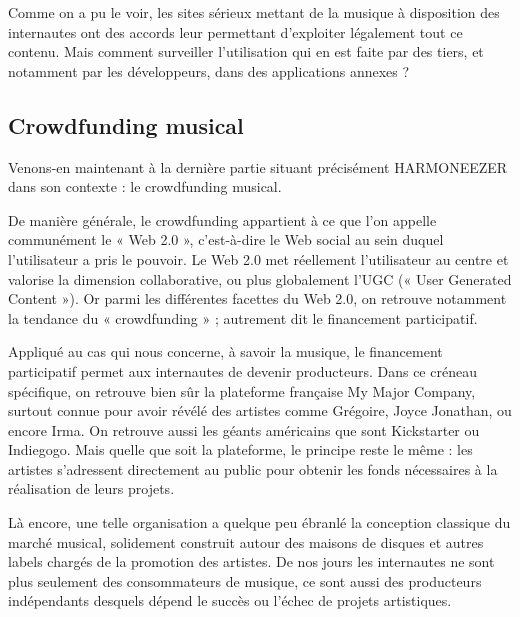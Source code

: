 \documentclass[a4paper,12pt]{article}
\begin{document}
Comme on a pu le voir, les sites sérieux mettant de la musique à disposition des internautes ont des accords leur permettant d'exploiter légalement tout ce contenu. Mais comment surveiller l'utilisation qui en est faite par des tiers, et notamment par les développeurs, dans des applications annexes ?

\subsection{Crowdfunding musical}

Venons-en maintenant à la dernière partie situant précisément HARMONEEZER dans son contexte : le crowdfunding musical.

De manière générale, le crowdfunding appartient à ce que l'on appelle communément le « Web 2.0 », c'est-à-dire le Web social au sein duquel l'utilisateur a pris le pouvoir. Le Web 2.0 met réellement l'utilisateur au centre et valorise la dimension collaborative, ou plus globalement l'UGC (« User Generated Content »). Or parmi les différentes facettes du Web 2.0, on retrouve notamment la tendance du « crowdfunding » ; autrement dit le financement participatif.

Appliqué au cas qui nous concerne, à savoir la musique, le financement participatif permet aux internautes de devenir producteurs. Dans ce créneau spécifique, on retrouve bien sûr la plateforme française My Major Company, surtout connue pour avoir révélé des artistes comme Grégoire, Joyce Jonathan, ou encore Irma. On retrouve aussi les géants américains que sont Kickstarter ou Indiegogo. Mais quelle que soit la plateforme, le principe reste le même : les artistes s'adressent directement au public pour obtenir les fonds nécessaires à la réalisation de leurs projets.

Là encore, une telle organisation a quelque peu ébranlé la conception classique du marché musical, solidement construit autour des maisons de disques et autres labels chargés de la promotion des artistes. De nos jours les internautes ne sont plus seulement des consommateurs de musique, ce sont aussi des producteurs indépendants desquels dépend le succès ou l'échec de projets artistiques.

\newpage

\end{document}
